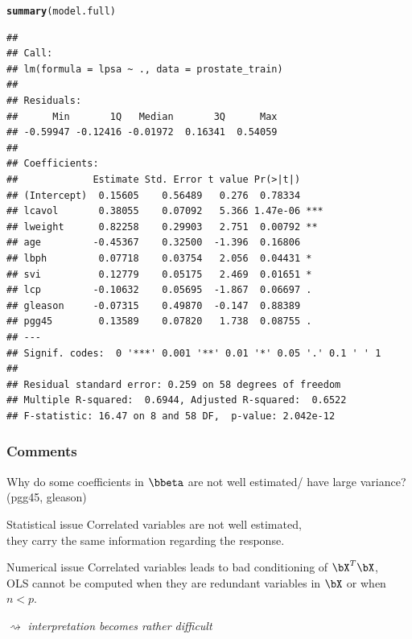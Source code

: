 \documentclass{beamer}\usepackage[]{graphicx}\usepackage[]{color}
\makeatletter
\newcommand{\hlstd}[1]{\textcolor[rgb]{0.345,0.345,0.345}{#1}}%
\newcommand{\hlkwd}[1]{\textcolor[rgb]{0.737,0.353,0.396}{\textbf{#1}}}%
\newenvironment{kframe}{%
 \def\at@end@of@kframe{}%
 \ifinner\ifhmode%
  \def\at@end@of@kframe{\end{minipage}}%
  \begin{minipage}{\columnwidth}%
 \fi\fi%
 \def\FrameCommand##1{\hskip\@totalleftmargin \hskip-\fboxsep
 \colorbox{shadecolor}{##1}\hskip-\fboxsep
     \hskip-\linewidth \hskip-\@totalleftmargin \hskip\columnwidth}%
 \MakeFramed {\advance\hsize-\width
   \@totalleftmargin\z@ \linewidth\hsize
   \@setminipage}}%
 {\par\unskip\endMakeFramed%
 \at@end@of@kframe}
\newenvironment{knitrout}{}{} %
\makeatother
\begin{document}
\begin{frame}
\begin{knitrout}\tiny
{}\color{fgcolor}\begin{kframe}
\begin{alltt}
\hlkwd{summary}\hlstd{(model.full)}
\end{alltt}
\begin{verbatim}
## 
## Call:
## lm(formula = lpsa ~ ., data = prostate_train)
## 
## Residuals:
##      Min       1Q   Median       3Q      Max 
## -0.59947 -0.12416 -0.01972  0.16341  0.54059 
## 
## Coefficients:
##             Estimate Std. Error t value Pr(>|t|)    
## (Intercept)  0.15605    0.56489   0.276  0.78334    
## lcavol       0.38055    0.07092   5.366 1.47e-06 ***
## lweight      0.82258    0.29903   2.751  0.00792 ** 
## age         -0.45367    0.32500  -1.396  0.16806    
## lbph         0.07718    0.03754   2.056  0.04431 *  
## svi          0.12779    0.05175   2.469  0.01651 *  
## lcp         -0.10632    0.05695  -1.867  0.06697 .  
## gleason     -0.07315    0.49870  -0.147  0.88389    
## pgg45        0.13589    0.07820   1.738  0.08755 .  
## ---
## Signif. codes:  0 '***' 0.001 '**' 0.01 '*' 0.05 '.' 0.1 ' ' 1
## 
## Residual standard error: 0.259 on 58 degrees of freedom
## Multiple R-squared:  0.6944,	Adjusted R-squared:  0.6522 
## F-statistic: 16.47 on 8 and 58 DF,  p-value: 2.042e-12
\end{verbatim}
\end{kframe}
\end{knitrout}
\end{frame}

\begin{frame}
  \frametitle{Comments}

  Why do  some coefficients in  $\bbeta$ are not well  estimated/ have
  large variance? (pgg45, gleason)

  \begin{block}{Statistical issue}
    \alert{Correlated variables are not well estimated},\\
    
    \rsa  they carry the same information regarding the response.

  \end{block}

  \vfill

  \begin{block}{Numerical issue}
    \alert{Correlated variables leads to bad conditioning of $\bX^T\bX$},\\

    \rsa OLS cannot be computed  when they are redundant variables in
      $\bX$ \alert{or when $n<p$}.
  \end{block}
  
  $\rightsquigarrow$ \textit{interpretation becomes rather difficult}

\end{frame}
\end{document}
